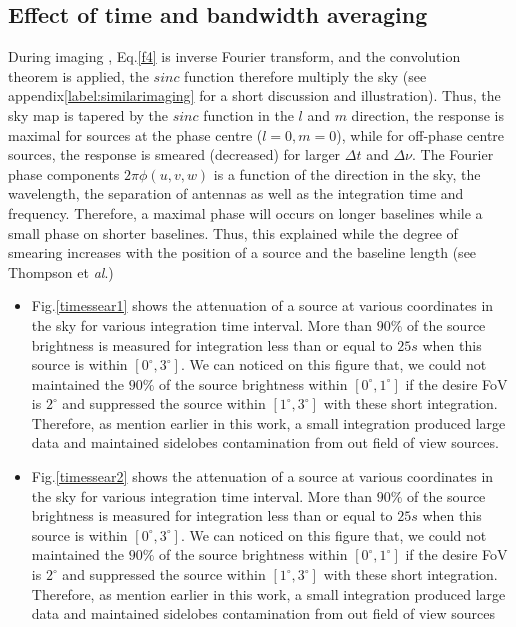 \documentclass[useAMS,usenatbib]{mn2e}
\begin{document}
\subsection{Effect of time and bandwidth averaging}
During imaging \citep{Marti2008}, Eq.\ref{f4} is inverse Fourier transform, and the convolution theorem is applied, the 
$sinc$ function therefore multiply the sky (see appendix\ref{label:similarimaging} for a short discussion and illustration). Thus, the 
sky map is tapered by the $sinc$ function in the $l$ and $m$ direction, the response is maximal for sources at the phase centre 
($l=0,m=0$), while for off-phase centre sources, the response is smeared (decreased) for larger $\Delta t$ and $\Delta \nu$. The 
Fourier phase components $2\pi \phi(u,v,w)$ is a function of the direction in the sky, the wavelength, the separation of antennas as well 
as the integration time and frequency. Therefore, a maximal phase will occurs on longer baselines while a small phase on shorter baselines. 
Thus, this explained while the degree of smearing increases with the position of a source and the baseline length (see Thompson 
et \textit{al}.)
\begin{itemize}
 \item Fig.\ref{timessear1} shows the attenuation of a source at various coordinates in the sky for various integration time interval. More 
than $90\%$ of the source brightness is measured for integration less than or equal to $25s$ when this source is within 
$[0^\circ,3^\circ]$. We can noticed on this figure that, we could not maintained the $90\%$ of the source brightness within 
$[0^\circ,1^\circ]$ if the desire FoV is $2^\circ$ and suppressed the source within $[1^\circ,3^\circ]$ with these short integration. 
Therefore, as mention earlier in this work, a small integration produced large data and maintained sidelobes contamination from out field 
of view sources.
  \item Fig.\ref{timessear2} shows the attenuation of a source at various coordinates in the sky for various integration 
time interval. More than $90\%$ of the source brightness is measured for integration less than or equal to $25s$ when this source is within 
$[0^\circ,3^\circ]$. We can noticed on this figure that, we could not maintained the $90\%$ of the source brightness within 
$[0^\circ,1^\circ]$ if the desire FoV is $2^\circ$ and suppressed the source within $[1^\circ,3^\circ]$ with these short integration. 
Therefore, as mention earlier in this work, a small integration produced large data and maintained sidelobes contamination from out field 
of view sources
\end{itemize}
\end{document}
